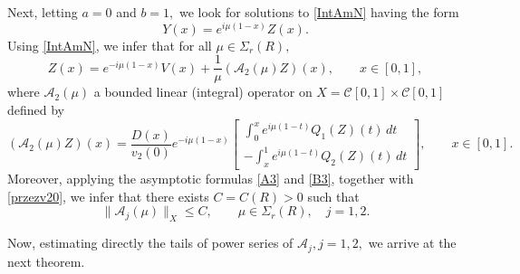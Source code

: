 \documentclass[11pt]{amsart}
\theoremstyle{plain}
\newtheorem{lem}[thm]{Lemma}
\theoremstyle{definition}
\theoremstyle{remark}
\numberwithin{equation}{section}
\begin{document}
Next, letting $a=0$ and $b=1,$ we look for solutions to \eqref{IntAmN} having the form
\[
Y(x)=e^{i\mu(1-x)}Z(x).
\]
Using \eqref{IntAmN}, we infer that
for all $\mu \in \Sigma_r(R),$
\begin{equation}\label{OA2}
Z(x)=e^{-i\mu(1-x)}V(x)+\frac{1}{\mu}
(\mathcal{A}_2(\mu)Z)(x), \qquad x\in [0,1],
\end{equation}
where $\mathcal{A}_2 (\mu)$ a bounded linear (integral) operator on
 $X=\mathcal C[0,1]\times \mathcal C[0,1]$
defined by
\[
(\mathcal{A}_2 (\mu)Z)(x)=
\frac{D(x)}{v_2(0)}e^{-i\mu (1-x)}
\left[\begin{array}{c}
\int_0^x e^{i\mu(1-t)} Q_1(Z)(t)\,dt\\
-\int_x^1 e^{i\mu(1-t)} Q_2(Z)(t)\,dt
\end{array}\right], \qquad x \in [0,1].
\]
Moreover,
applying the asymptotic formulas
\eqref{A3} and \eqref{B3}, together with \eqref{przezv20},
we infer that there exists $C=C(R)>0$ such that
\[
\|\mathcal{A}_j(\mu)\|_X\le C,\qquad \mu\in \Sigma_r(R), \quad j=1,2.
\]

Now,  estimating directly the tails
 of power series of $\mathcal A_j, j=1,2,$ we arrive at the next theorem.
\end{document}
